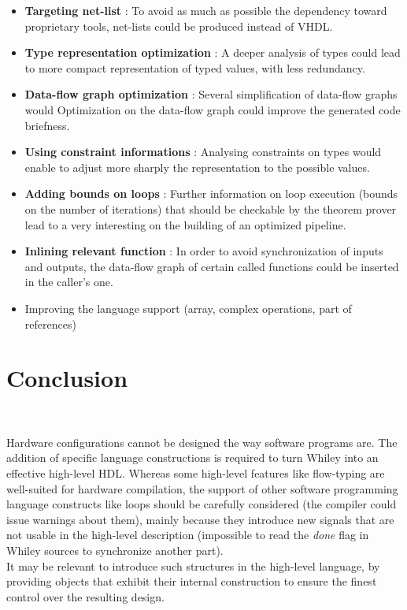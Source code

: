 \documentclass[10pt,a4paper]{article}
\renewcommand{\indent}{~\\\vspace{-.8cm}}
\begin{document}
\begin{itemize}
	\item \textbf{Targeting net-list} : To avoid as much as possible the dependency toward proprietary tools, net-lists could be produced instead of VHDL.
	\item \textbf{Type representation optimization} : A deeper analysis of types could lead to more compact representation of typed values, with less redundancy. 
	\item \textbf{Data-flow graph optimization} : Several simplification of data-flow graphs would Optimization on the data-flow graph could improve the generated code briefness.
	\item \textbf{Using constraint informations} : Analysing constraints on types would enable to adjust more sharply the representation to the possible values.
	\item \textbf{Adding bounds on loops} : Further information on loop execution (bounds on the number of iterations) that should be checkable by the theorem prover lead to a very interesting on the building of an optimized pipeline.
	\item \textbf{Inlining relevant function} : In order to avoid synchronization of inputs and outputs, the data-flow graph of certain called functions could be inserted in the caller's one.
	\item Improving the language support (array, complex operations, part of references)
\end{itemize}
 
\section*{Conclusion}\indent
{}

 

Hardware configurations cannot be designed the way software programs are. The addition of specific language constructions is required to turn Whiley into an effective high-level HDL. Whereas some high-level features like flow-typing are well-suited for hardware compilation,  the support of other software programming language constructs like loops should be carefully considered (the compiler could issue warnings about them), mainly because they introduce new signals that are not usable in the high-level description (impossible to read the \textit{done} flag in Whiley sources to synchronize another part). \\

It may be relevant to introduce such structures in the high-level language, by providing objects that exhibit their internal construction to ensure the finest control over the resulting design.
 
\end{document}
